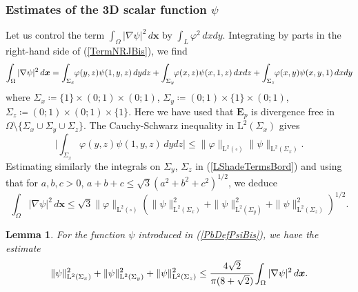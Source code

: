 \documentclass[11pt,a4paper]{article}
\newcommand{\Om}{\Omega}
\newcommand{\mrm}[1]{\mathrm{#1}}
\newcommand{\bfx}{\boldsymbol{x}}
\newcommand{\mL}{\mrm{L}}
\newcommand{\GL}{L}
\def\E{\boldsymbol{E}}
\newtheorem{lemma}[theorem]{Lemma}
\begin{document}
\subsubsection*{Estimates of the 3D scalar function $\psi$}

Let us control the term $\int_{\Om} |\nabla\psi|^2\,d\bfx$ by $\int_\GL\varphi^2\,dxdy$. Integrating by parts in the right-hand side of (\ref{TermNRJBis}), we find
\begin{equation}\label{LShadeTermsBord}
\int_\Om|\nabla\psi|^2\,d\bfx=\int_{\Sigma_x}\hspace{-0.1cm}\varphi(y,z)\psi(1,y,z)\,dydz+\int_{\Sigma_y}\hspace{-0.1cm}\varphi(x,z)\psi(x,1,z)\,dxdz+\int_{\Sigma_z}\hspace{-0.1cm}\varphi(x,y)\psi(x,y,1)\,dxdy
\end{equation}
where $\Sigma_x\coloneqq\{1\}\times(0;1)\times(0;1)$, $\Sigma_y\coloneqq(0;1)\times\{1\}\times(0;1)$, $\Sigma_z\coloneqq(0;1)\times(0;1)\times\{1\}$. Here we have used that $\E_p$ is divergence free in $\Om\setminus\{\Sigma_x\cup\Sigma_y\cup\Sigma_z\}$. The Cauchy-Schwarz inequality in $\mL^2(\Sigma_x)$ gives
\[
\bigg|\int_{\Sigma_x}\varphi(y,z)\psi(1,y,z)\,dydz\bigg|\le \|\varphi\|_{\mL^2(\square)}\|\psi\|_{\mL^2(\Sigma_x)}.
\]
Estimating similarly the integrals on $\Sigma_y$, $\Sigma_z$ in (\ref{LShadeTermsBord}) and using that for $a,b,c>0$, $a+b+c\le\sqrt{3}(a^2+b^2+c^2)^{1/2}$, we deduce
\begin{equation}\label{EstimDep}
\int_\Om|\nabla\psi|^2\,d\bfx \le \sqrt{3}\|\varphi\|_{\mL^2(\square)}(\|\psi\|^2_{\mL^2(\Sigma_x)}+\|\psi\|^2_{\mL^2(\Sigma_y)}+\|\psi\|^2_{\mL^2(\Sigma_z)})^{1/2}.
\end{equation}
\begin{lemma}
For the function $\psi$ introduced in (\ref{PbDefPsiBis}), we have the estimate
\begin{equation}\label{EstimEtaQua}
\|\psi\|^2_{\mL^2(\Sigma_x)}+\|\psi\|^2_{\mL^2(\Sigma_y)}+\|\psi\|^2_{\mL^2(\Sigma_z)} \le \cfrac{4\sqrt{2}}{\pi(8+\sqrt{2})} \int_{\Om}|\nabla\psi|^2\,d\bfx.
\end{equation}
\end{lemma}
\end{document}
